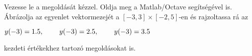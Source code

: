 Vezesse le a 
\de{} megoldását kézzel. 
Oldja meg a Matlab/Octave   segítségével is. 
Ábrázolja az egyenlet vektormezejét a $[-3,3]\times [-2,5]$-en és 
rajzoltassa rá az 
\centerline{$y(-3)=1.5, \hspace{0.8cm} y(-3)=2.5, \hspace{0.8cm} y(-3)=3.5$}
kezdeti értékekhez tartozó megoldásokat is.


